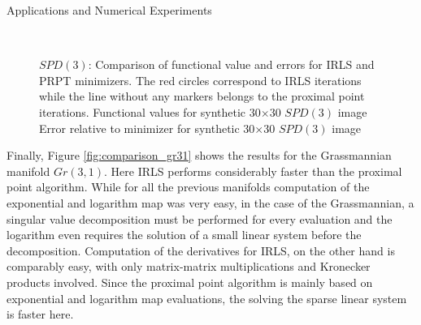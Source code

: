 \begin{chapter}{Applications and Numerical Experiments}
\begin{figure}[h!]
    \centering
    \\
    \caption[Comparison IRLS \& PRPT for $SPD(3)$]{$SPD(3)$: Comparison of functional value and errors for IRLS and PRPT minimizers.
	The red circles correspond to IRLS iterations while the line without any markers belongs to the proximal point iterations.
	 Functional values for synthetic 30$\times$30 $SPD(3)$ image
	  Error relative to minimizer for synthetic 30$\times$30 $SPD(3)$ image
	\label{fig:comparison_spd}
    }
\end{figure}

Finally, Figure \ref{fig:comparison_gr31} shows the results for the Grassmannian manifold $Gr(3,1)$.
Here IRLS performs considerably faster than the proximal point algorithm. While for all the previous
manifolds computation of the exponential and logarithm map was very easy, in the case of the Grassmannian,
a singular value decomposition must be performed for every evaluation and the logarithm even requires the solution
of a small linear system before the decomposition. Computation of the derivatives for IRLS, on the other hand is
comparably easy, with only matrix-matrix multiplications and Kronecker products involved. Since the proximal point
algorithm is mainly based on exponential and logarithm map evaluations, the solving the sparse linear system is
faster here.


\end{chapter}
